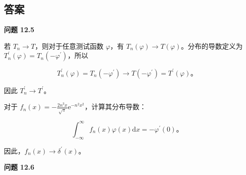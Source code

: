\subsection{答案}\label{ux7b54ux6848}

\textbf{问题 12.5}

若 $T_n \to T$，则对于任意测试函数 $\varphi$，有
$T_n(\varphi) \to T(\varphi)$。分布的导数定义为
$T_n^{\prime}(\varphi) = T_n(-\varphi^{\prime})$，所以

$$
T_n^{\prime}(\varphi) = T_n(-\varphi^{\prime}) \to T(-\varphi^{\prime}) = T^{\prime}(\varphi)。
$$

因此 $T_n^{\prime} \to T^{\prime}$。

对于
$f_n(x) = -\frac{2 n^3 x}{\sqrt{\pi}} \mathrm{e}^{-n^2 x^2}$，计算其分布导数：

$$
\int_{-\infty}^\infty f_n(x) \varphi(x) \mathrm{d}x = -\varphi^{\prime}(0)。
$$

因此，$f_n(x) \to \delta^{\prime}(x)$。


\textbf{问题 12.6}

